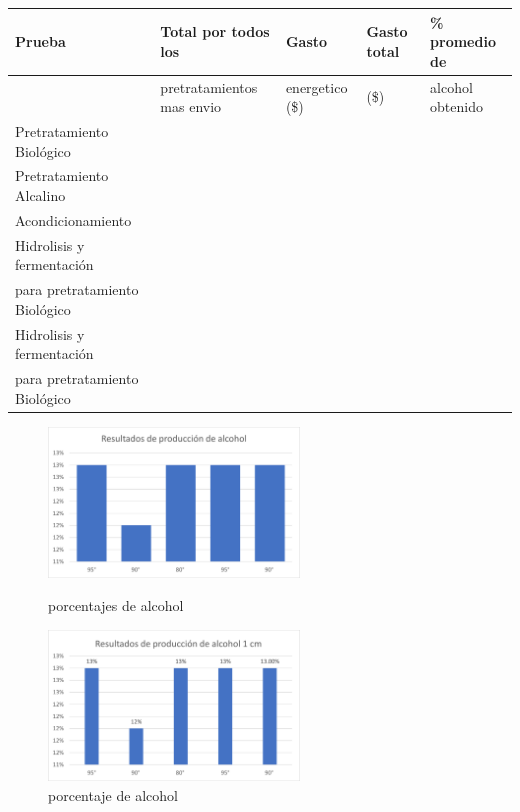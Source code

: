 \documentclass[12pt]{article}
\begin{document}
	
	\begin{table}[H]
		\centering
		\resizebox{16cm}{!} {
			\begin{tabular}{|l|l|l|l|l|}
				\hline
				Prueba & Total por todos los  & Gasto  & Gasto total & \% promedio de  \\ \hline
				~ &  pretratamientos mas envio &  energetico (\$) &   (\$) &  alcohol obtenido  \\ \hline
				
				Pretratamiento Biológico & ~ & ~ & ~ &   \\ \hline
				Pretratamiento Alcalino & ~ & ~ & ~ &   \\ \hline
				Acondicionamiento & ~ & ~ & ~ &   \\ \hline
				Hidrolisis y fermentación  & ~ & ~ & ~ &   \\ \hline
				para pretratamiento Biológico & ~ & ~ & ~ &   \\ \hline
				Hidrolisis y fermentación  & ~ & ~ & ~ &   \\ \hline
				para pretratamiento Biológico & ~ & ~ & ~ &   \\ \hline
		\end{tabular}	}
	\end{table}
	
	
	
	\begin{figure}[H]
		\centering
		\begin{minipage}{0.46\textwidth}
			\centering
			\includegraphics[width=\linewidth, height=4cm, keepaspectratio]{imagenes/porcentajes}
			\caption{porcentajes de alcohol}
			\label{cernir_bagazo_varios}
		\end{minipage}
		\hfill
		\begin{minipage}{0.48\textwidth}
			\centering
			\includegraphics[width=\linewidth, height=4cm, keepaspectratio]{imagenes/porcentaje_1cm_alcalino}
			\caption{porcentaje de alcohol}
			\label{cernir_bagazo_cedazo_1 cm}
		\end{minipage}
	\end{figure}
	
\end{document}
